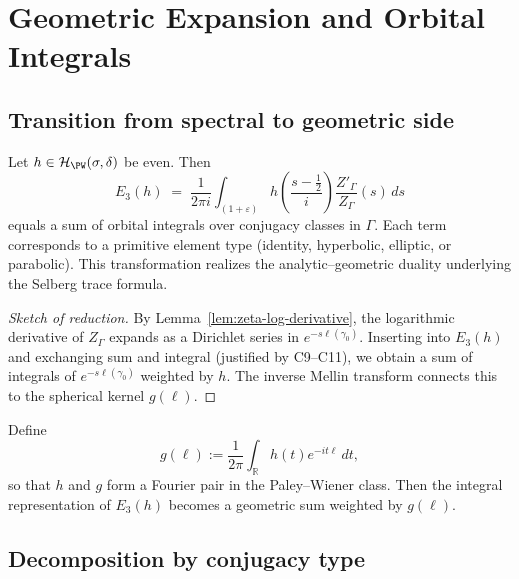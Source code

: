 \section{Geometric Expansion and Orbital Integrals}
\label{sec:ch4-part5-geom-expansion} \relax \hspace{0pt}

\subsection{Transition from spectral to geometric side}
\label{subsec:ch4-part5-transition} \relax

\begin{theorem}
\label{thm:selberg-trace-analytic}
Let $h\in\mathcal{H}_{\PW}(\sigma,\delta)$ be even. Then
\[
E_3(h) \;=\; \frac{1}{2\pi i}\!\int_{(1+\varepsilon)}\!
h\!\left(\frac{s-\tfrac12}{i}\right)\frac{Z'_\Gamma}{Z_\Gamma}(s)\,ds
\]
equals a sum of orbital integrals over conjugacy classes in $\Gamma$. Each term corresponds to a primitive element type (identity, hyperbolic, elliptic, or parabolic). This transformation realizes the analytic–geometric duality underlying the Selberg trace formula.
\end{theorem}

\begin{proof}[Sketch of reduction]
By Lemma~\ref{lem:zeta-log-derivative}, the logarithmic derivative of $Z_\Gamma$ expands as a Dirichlet series in $e^{-s\ell(\gamma_0)}$. Inserting into $E_3(h)$ and exchanging sum and integral (justified by C9–C11), we obtain a sum of integrals of $e^{-s\ell(\gamma_0)}$ weighted by $h$. The inverse Mellin transform connects this to the spherical kernel $g(\ell)$. \relax
\end{proof}

\begin{definition}
\label{def:spherical-transform-dual}
Define
\[
g(\ell) := \frac{1}{2\pi}\int_{\mathbb{R}} h(t)e^{-i t\ell}\,dt,
\]
so that $h$ and $g$ form a Fourier pair in the Paley–Wiener class. Then the integral representation of $E_3(h)$ becomes a geometric sum weighted by $g(\ell)$. \relax
\end{definition}

\subsection{Decomposition by conjugacy type}
\label{subsec:ch4-part5-decomposition} \relax

